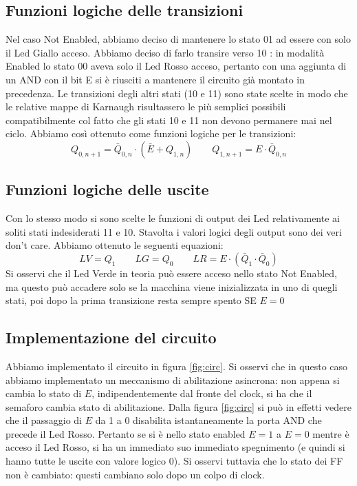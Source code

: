 \documentclass[10pt,a4paper]{article}
\begin{document}
\subsection{Funzioni logiche delle transizioni}
Nel caso Not Enabled, abbiamo deciso di mantenere lo stato 01 ad essere con solo il Led Giallo acceso. Abbiamo deciso di farlo transire verso 10 : in modalità Enabled lo stato 00 aveva solo il Led Rosso acceso, pertanto con una aggiunta di un AND con il bit E si è riusciti a mantenere il circuito già montato in precedenza. Le transizioni degli altri stati (10 e 11) sono state scelte in modo che le relative mappe di Karnaugh risultassero le più semplici possibili compatibilmente col fatto che gli stati 10 e 11 non devono permanere mai nel ciclo.
Abbiamo così ottenuto come funzioni logiche per le transizioni:
\begin{equation}
Q_{0, n+1} = \bar{Q}_{0,n}\cdot(\bar{E}+Q_{1,n})\qquad
Q_{1, n+1} = E\cdot \bar{Q}_{0, n}
\end{equation}
\subsection{Funzioni logiche delle uscite}
Con lo stesso modo si sono scelte le funzioni di output dei Led relativamente ai soliti stati indesiderati 11 e 10. Stavolta i valori logici degli output sono dei veri don't care. Abbiamo ottenuto le seguenti equazioni:
\begin{equation}
LV = Q_1\qquad LG = Q_0\qquad LR = E\cdot(\bar{Q}_1\cdot\bar{Q}_0)
\end{equation}
Si osservi che il Led Verde in teoria può essere acceso nello stato Not Enabled, ma questo può accadere solo se la macchina viene inizializzata in uno di quegli stati, poi dopo la prima transizione resta sempre spento SE $E=0$%

\subsection{Implementazione del circuito}
Abbiamo implementato il circuito in figura \ref{fig:circ}.
Si osservi che in questo caso abbiamo implementato un meccanismo di abilitazione asincrona: non appena si cambia lo stato di $E$, indipendentemente dal fronte del clock, si ha che il semaforo cambia stato di abilitazione.
Dalla figura \ref{fig:circ} si può in effetti vedere che il passaggio di $E$ da 1 a 0 disabilita istantaneamente la porta AND che precede il Led Rosso. Pertanto se si è nello stato enabled $E=1$ a $E=0$ mentre è acceso il Led Rosso, si ha un immediato suo immediato spegnimento (e quindi si hanno tutte le uscite con valore logico 0). Si osservi tuttavia che lo stato dei FF non è cambiato: questi cambiano solo dopo un colpo di clock. %
\end{document}
